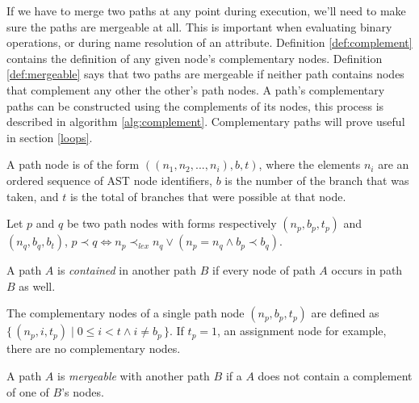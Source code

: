 \documentclass[a4paper, 16pt, oneside]{Thesis}
\begin{document}
If we have to merge two paths at any point during execution, we'll need
to make sure the paths are mergeable at all. This is important when
evaluating binary operations, or during name resolution of an attribute.
Definition \ref{def:complement} contains the definition of any given
node's complementary nodes. Definition \ref{def:mergeable} says that two
paths are mergeable if neither path contains nodes that complement any
other the other's path nodes. A path's complementary paths can be
constructed using the complements of its nodes, this process is
described in algorithm \ref{alg:complement}. Complementary paths will
prove useful in section \ref{loops}.

\begin{definition} \label{def:path_node}
A path node is of the form $((n_1, n_2, ... , n_i), b, t)$, where the elements $n_i$ are an ordered sequence of AST node identifiers, $b$ is the number of the branch that was taken, and $t$ is the total of branches that were possible at that node.
\end{definition}

\begin{definition} \label{def:path_order}
Let $p$ and $q$ be two path nodes with forms respectively $(n_p, b_p, t_p)$ and $(n_q, b_q, b_t)$, $p \prec q \iff n_p \prec_{lex} n_q \vee (n_p = n_q \wedge b_p \prec b_q )$. 
\end{definition}

\begin{definition} \label{def:contain}
A path $A$ is \textit{contained} in another path $B$ if every node of path $A$ occurs in path $B$ as well.
\end{definition}

\begin{definition} \label{def:complement}
The complementary nodes of a single path node $(n_p, b_p, t_p)$ are defined as $\{\, (n_p, i, t_p) \mid 0 \leq i < t \wedge i \neq b_p \,\}$. If $t_p = 1$, an assignment node for example, there are no complementary nodes.
\end{definition}

\begin{definition} \label{def:mergeable}
A path $A$ is \textit{mergeable} with another path $B$ if a $A$ does not contain a complement of one of $B$'s nodes. \end{definition}
\end{document}
